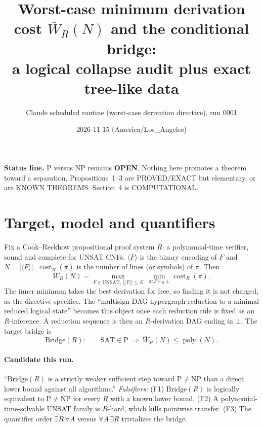 \documentclass[11pt]{article}
\title{Worst-case minimum derivation cost $\overline W_R(N)$ and the conditional bridge:\\
a logical collapse audit plus exact tree-like data}
\author{Claude scheduled routine (worst-case derivation directive), run 0001}
\date{2026-11-15 (America/Los\_Angeles)}
\begin{document}
\maketitle

\noindent\textbf{Status line.} P versus NP remains \textbf{OPEN}. Nothing here promotes a theorem
toward a separation. Propositions~1--3 are PROVED/EXACT but elementary, or are KNOWN THEOREMS.
Section~4 is COMPUTATIONAL.

\section{Target, model and quantifiers}
Fix a Cook--Reckhow propositional proof system $R$: a polynomial-time verifier, sound and complete for UNSAT CNFs.
$\langle F\rangle$ is the binary encoding of $F$ and $N=|\langle F\rangle|$. $\operatorname{cost}_R(\pi)$ is the number of lines (or symbols) of $\pi$. Then
\[
\overline W_R(N)=\max_{F\in\mathrm{UNSAT},\,|\langle F\rangle|\le N}\ \min_{\pi:F\vdash_R\bot}\operatorname{cost}_R(\pi).
\]
The inner minimum takes the best derivation for free, so finding it is not charged, as the directive specifies.
The ``multisign DAG hypergraph reduction to a minimal reduced logical state'' becomes this object once each
reduction rule is fixed as an $R$-inference. A reduction sequence is then an $R$-derivation DAG ending in $\bot$.
The target bridge is
\[
\mathrm{Bridge}(R):\qquad \mathrm{SAT}\in\mathrm P\ \Longrightarrow\ \overline W_R(N)\le\operatorname{poly}(N).
\]

\paragraph{Candidate this run.} ``$\mathrm{Bridge}(R)$ is a strictly weaker sufficient step toward P$\neq$NP than a direct lower bound against all algorithms.''
\emph{Falsifiers:} (F1) $\mathrm{Bridge}(R)$ is logically equivalent to P$\neq$NP for every $R$ with a known lower bound.
(F2) A polynomial-time-solvable UNSAT family is $R$-hard, which kills pointwise transfer.
(F3) The quantifier order $\exists R\,\forall A$ versus $\forall A\,\exists R$ trivializes the bridge.
\end{document}
